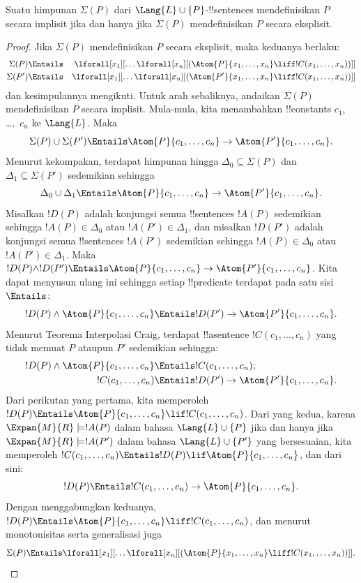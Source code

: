 \documentclass[../../../include/open-logic-section]{subfiles}
\begin{document}
\begin{thm} Suatu himpunan $\Sigma(P)$ dari
  $\Lang{L} \cup\{P\}$-!!{sentence}s mendefinisikan $P$ secara implisit
  jika dan hanya jika $\Sigma(P)$ mendefinisikan $P$ secara eksplisit.
\end{thm}

\begin{proof}
Jika $\Sigma(P)$ mendefinisikan $P$ secara eksplisit, maka keduanya berlaku:
\begin{align*}
  \Sigma(P) & \Entails & \lforall[x_1][\dots \lforall[x_n]
    [(\Atom{P}{x_1,\dots, x_n} \liff !C(x_1,\dots,x_n))]]\\
  \Sigma(P') & \Entails & \lforall[x_1][\dots \lforall[x_n]
    [(\Atom{P'}{x_1,\dots, x_n} \liff !C(x_1,\dots,x_n))]]
\end{align*}
dan kesimpulannya mengikuti. Untuk arah sebaliknya, andaikan $\Sigma(P)$
mendefinisikan $P$ secara implisit. Mula-mula, kita menambahkan !!{constant}s
$c_1$, \dots,~$c_n$ ke $\Lang{L}$. Maka
\[
\Sigma(P) \cup \Sigma(P') \Entails
\Atom{P}{c_1, \dots, c_n} \to  \Atom{P'}{c_1, \dots, c_n}.
\]
Menurut kekompakan, terdapat himpunan hingga $\Delta_0 \subseteq \Sigma(P)$
dan $\Delta_1 \subseteq \Sigma(P')$ sedemikian sehingga
\[
\Delta_0 \cup \Delta_1 \Entails
\Atom{P}{c_1, \dots, c_n} \to \Atom{P'}{c_1, \dots, c_n}.
\]
Misalkan $!D(P)$ adalah konjungsi semua !!{sentence}s $!A(P)$ sedemikian
sehingga $!A(P) \in \Delta_0$ atau $!A(P') \in \Delta_1$, dan misalkan
$!D(P')$ adalah konjungsi semua !!{sentence}s $!A(P')$ sedemikian sehingga
$!A(P) \in \Delta_0$ atau $!A(P') \in \Delta_1$. Maka $!D(P) \land
!D(P') \Entails \Atom{P}{c_1, \dots, c_n} \to
\Atom{P'}{c_1,\dots,c_n}$. Kita dapat menyusun ulang ini sehingga setiap
!!{predicate} terdapat pada satu sisi $\Entails$:
\[
!D(P) \land \Atom{P}{c_1, \dots, c_n} \Entails
!D(P') \to \Atom{P'}{c_1, \dots, c_n}.
\]
Menurut Teorema Interpolasi Craig, terdapat !!a{sentence}
$!C(c_1,\dots, c_n)$ yang tidak memuat $P$ ataupun $P'$ sedemikian sehingga:
\begin{align*}
  !D(P) \land \Atom{P}{c_1, \dots, c_n} & \Entails !C(c_1,\dots, c_n); \\
  !C(c_1,\dots, c_n) & \Entails !D(P') \to \Atom{P'}{c_1, \dots, c_n}.
\end{align*}
Dari perikutan yang pertama, kita memperoleh $!D(P) \Entails
\Atom{P}{c_1,\dots, c_n} \lif !C(c_1,\dots, c_n)$. Dari yang kedua,
karena $\Expan{M}{R} \models !A(P)$ dalam bahasa $\Lang{L} \cup \{P\}$
jika dan hanya jika $\Expan{M}{R} \models !A(P')$ dalam bahasa
$\Lang{L} \cup \{P'\}$ yang bersesuaian, kita memperoleh
$!C(c_1,\dots, c_n) \Entails !D(P) \lif \Atom{P}{c_1,\dots, c_n}$,
dan dari sini:
\[
!D(P) \Entails !C(c_1,\dots,c_n) \to \Atom{P}{c_1,\dots, c_n}.
\]
Dengan menggabungkan keduanya, $!D(P) \Entails
\Atom{P}{c_1,\dots, c_n} \liff !C(c_1, \dots, c_n)$, dan menurut
monotonisitas serta generalisasi juga
\[
\Sigma(P) \Entails
\lforall[x_1][\dots\lforall[x_n][(\Atom{P}{x_1,\dots, x_n} \liff
    !C(x_1,\dots, x_n))]].
\]
\end{proof}
\end{document}
